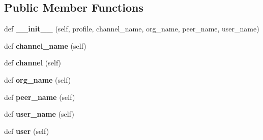 \subsection*{Public Member Functions}
\begin{DoxyCompactItemize}
\item 
\mbox{\label{classavalon__sdk_1_1connector_1_1blockchains_1_1fabric_1_1base_1_1ClientBase_a7a5635deb8d1d05104fa26a08a5afa28}} 
def {\bfseries \+\_\+\+\_\+init\+\_\+\+\_\+} (self, profile, channel\+\_\+name, org\+\_\+name, peer\+\_\+name, user\+\_\+name)
\item 
\mbox{\label{classavalon__sdk_1_1connector_1_1blockchains_1_1fabric_1_1base_1_1ClientBase_ad772b5b88947fbaa4ddda05fcb9fce2f}} 
def {\bfseries channel\+\_\+name} (self)
\item 
\mbox{\label{classavalon__sdk_1_1connector_1_1blockchains_1_1fabric_1_1base_1_1ClientBase_a62bb2f573e4f752dea97246da4dc17fc}} 
def {\bfseries channel} (self)
\item 
\mbox{\label{classavalon__sdk_1_1connector_1_1blockchains_1_1fabric_1_1base_1_1ClientBase_a6ffdd9be9feee424a6781ef25b3896b3}} 
def {\bfseries org\+\_\+name} (self)
\item 
\mbox{\label{classavalon__sdk_1_1connector_1_1blockchains_1_1fabric_1_1base_1_1ClientBase_ad6c14f34e4fd1a84c57bc548af95301b}} 
def {\bfseries peer\+\_\+name} (self)
\item 
\mbox{\label{classavalon__sdk_1_1connector_1_1blockchains_1_1fabric_1_1base_1_1ClientBase_a5788850944c365e04676d078aac8765a}} 
def {\bfseries user\+\_\+name} (self)
\item 
\mbox{\label{classavalon__sdk_1_1connector_1_1blockchains_1_1fabric_1_1base_1_1ClientBase_af81f7a992493a4f168db50fe8d912e62}} 
def {\bfseries user} (self)
\end{DoxyCompactItemize}
